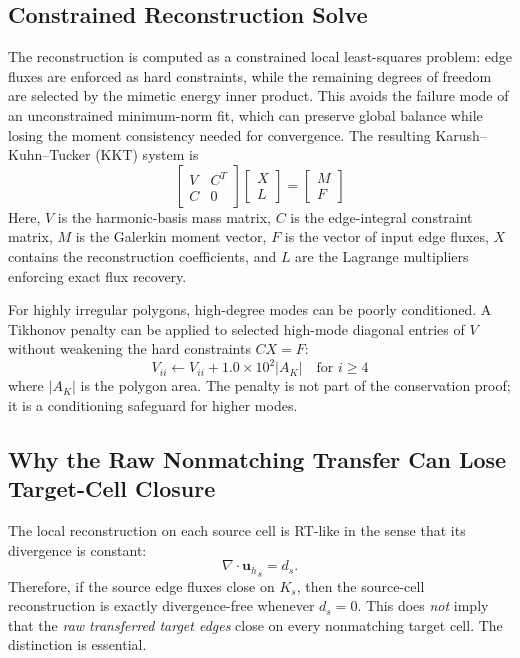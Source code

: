 \documentclass[11pt]{article}
\newcommand{\uh}{\mathbf{u}_h}
\begin{document}
\subsection{Constrained Reconstruction Solve}
The reconstruction is computed as a constrained local least-squares problem:
edge fluxes are enforced as hard constraints, while the remaining degrees of
freedom are selected by the mimetic energy inner product.  This avoids the
failure mode of an unconstrained minimum-norm fit, which can preserve global
balance while losing the moment consistency needed for convergence.  The
resulting Karush--Kuhn--Tucker (KKT) system is
\begin{equation}
\begin{bmatrix}
V & C^T \\
C & 0
\end{bmatrix}
\begin{bmatrix}
X \\
L
\end{bmatrix}
=
\begin{bmatrix}
M \\
F
\end{bmatrix}
\end{equation}
Here, \(V\) is the harmonic-basis mass matrix, \(C\) is the edge-integral
constraint matrix, \(M\) is the Galerkin moment vector, \(F\) is the vector of
input edge fluxes, \(X\) contains the reconstruction coefficients, and \(L\) are
the Lagrange multipliers enforcing exact flux recovery.

For highly irregular polygons, high-degree modes can be poorly conditioned.  A
Tikhonov penalty can be applied to selected high-mode diagonal entries of \(V\)
without weakening the hard constraints \(CX=F\):
\begin{equation}
V_{ii} \leftarrow V_{ii} + 1.0 \times 10^2 |A_K| \quad \text{for } i \ge 4
\end{equation}
where \(|A_K|\) is the polygon area.  The penalty is not part of the
conservation proof; it is a conditioning safeguard for higher modes.

\subsection{Why the Raw Nonmatching Transfer Can Lose Target-Cell Closure}

The local reconstruction on each source cell is RT-like in the sense that its
divergence is constant:
\[
  \nabla\cdot {\uh}_s = d_s .
\]
Therefore, if the source edge fluxes close on \(K_s\), then the source-cell
reconstruction is exactly divergence-free whenever \(d_s=0\).  This does
\emph{not} imply that the \emph{raw transferred target edges} close on every
nonmatching target cell.  The distinction is essential.
\end{document}
